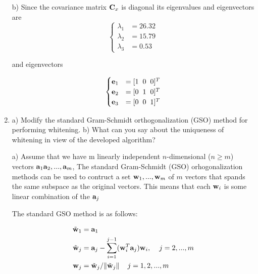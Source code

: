 \begin{enumerate}
\begin{solution}
    b) Since the covariance matrix $\mathbf{C}_x$ is diagonal its
    eigenvalues and eigenvectors are
    \[
    \begin{cases}
      \lambda_1 &= 26.32 \\
      \lambda_2 &= 15.79 \\
      \lambda_3 &= 0.53
    \end{cases}
    \]

    and eigenvectors

    \[
    \begin{cases}
      \mathbf{e}_1 &= [1 \hspace{2mm} 0 \hspace{2mm} 0]^T \\
      \mathbf{e}_2 &= [0 \hspace{2mm} 1 \hspace{2mm} 0]^T \\
      \mathbf{e}_3 &= [0 \hspace{2mm} 0 \hspace{2mm} 1]^T
    \end{cases}
    \]

  \end{solution}

\item a) Modify the standard Gram-Schmidt orthogonalization (GSO)
  method for performing whitening. b) What can you say about the
  uniqueness of whitening in view of the developed algorithm?

  \begin{solution}

    a) Assume that we have m linearly independent $n$-dimensional
    ($n\geq m$) vectors $\mathbf{a}_1 \mathbf{a}_2, ..., \mathbf{a}_m$, The
    standard Gram-Schmidt (GSO) orhogonalization methods can be used
    to contruct a set $\mathbf{w}_1, ..., \mathbf{w}_m$ of $m$ vectors
    that spands the same subspace as the original vectors. This means
    that each $\mathbf{w}_i$ is some linear combination of the
    $\mathbf{a}_j$

    The standard GSO method is as follows:

    \[
    \begin{split}
      \tilde{\mathbf{w}}_1 &= \mathbf{a}_1 \\
      \tilde{\mathbf{w}}_j &= \mathbf{a}_j - \sum_{i=1}^{j-1} (\mathbf{w}_i^T
      \mathbf{a}_j)\mathbf{w}_i, \hspace{4mm} j=2,...,m \\
      \mathbf{w}_j &= \tilde{\mathbf{w}}_j / \| \tilde{\mathbf{w}}_j \| \hspace{4mm} j=1,2,...,m
    \end{split}
    \]


\end{solution}
\end{enumerate}
